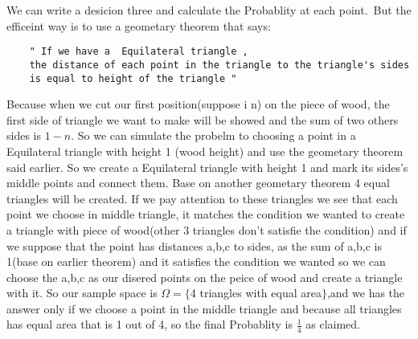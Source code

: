 \documentclass[12pt]{article}
\begin{document}
We can write a desicion three and calculate the Probablity at each point.\
\newline But the efficeint way is to use a geometary theorem that says:
\begin{verbatim}
    " If we have a 	Equilateral triangle ,
    the distance of each point in the triangle to the triangle's sides 
    is equal to height of the triangle "
\end{verbatim}

Because when we cut our first position(suppose i n) on the piece of wood, the
first side of triangle we want to make will be showed and the sum of two others
sides is $ 1 - n $. \newline So we can simulate the probelm to choosing a point
in a Equilateral triangle with height 1 (wood height) and use the geometary
theorem said earlier. \newline So we create a Equilateral triangle with height
1 and mark its sides's middle points and connect them. \newline Base on another
geometary theorem 4 equal triangles will be created. \newline If we pay
attention to these triangles we see that each point we choose in middle
triangle, it matches the condition we wanted to create a triangle with piece of
wood(other 3 triangles don't satisfie the condition) and if we suppose that the
point has distances a,b,c to sides, as the sum of a,b,c is 1(base on earlier
theorem) and it satisfies the condition we wanted so we can choose the a,b,c as
our disered points on the peice of wood and create a triangle with it.\newline
So our sample space is $\Omega = \{$4 triangles with equal area$\}$,and we has
the answer only if we choose a point in the middle triangle and because all
triangles has equal area that is 1 out of 4, so the final Probablity is
$\frac{1}{4}$ as claimed.
\end{document}
